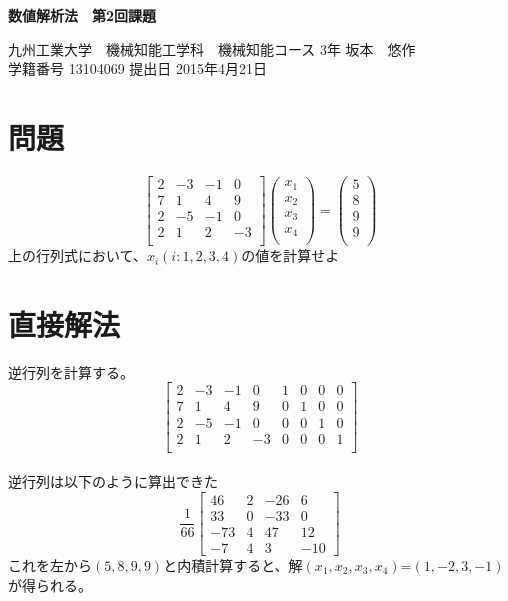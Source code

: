 \documentclass[a4j,twoside,openright,11pt]{jreport}
\begin{document}
\begin{screen}
\huge
\begin{center}
{\bf 数値解析法　第2回課題}\\
\end{center}

\normalsize
\begin{flushright}
九州工業大学　機械知能工学科　機械知能コース 3年 坂本　悠作\\学籍番号 13104069 \hspace{0.2in}提出日 2015年4月21日
\end{flushright}
\end{screen}

\section{問題}
\[
  \left[
    \begin{array}{rrrr}
      2 & -3 & -1 &0\\
      7 & 1 & 4 & 9\\
      2 & -5 & -1 & 0\\
      2 & 1 & 2 & -3\\
    \end{array}
  \right]
\left(
    \begin{array}{r}
      x_1 \\
      x_2 \\
      x_3 \\
      x_4 \\
    \end{array}
  \right)
  =
\left(
    \begin{array}{r}
      5 \\
      8 \\
      9 \\
      9 \\
    \end{array}
  \right)
\]
上の行列式において、$x_{i} (i:1,2,3,4)$の値を計算せよ

\section{直接解法}
逆行列を計算する。
\[
  \left[
    \begin{array}{rrrr|rrrr}
      2 & -3 & -1 &0  &1&0&0&0\\
      7 & 1 & 4 & 9   &0&1&0&0\\
      2 & -5 & -1 & 0 &0&0&1&0\\
      2 & 1 & 2 & -3  &0&0&0&1\\
    \end{array}
  \right]
\]
\\
逆行列は以下のように算出できた\\
\[
\frac{1}{66}
  \left[
    \begin{array}{rrrr}
      46  & 2& -26&  6\\
      33  & 0& -33&  0\\
      -73 & 4&  47& 12\\
      -7  & 4&   3&-10
    \end{array}
  \right]
\]
これを左から$\left( 5,8,9,9  \right)$と内積計算すると、解$\left( x_1,x_2,x_3,x_4 \right)$=$\left(1,-2,3,-1\right)$が得られる。
\end{document}
